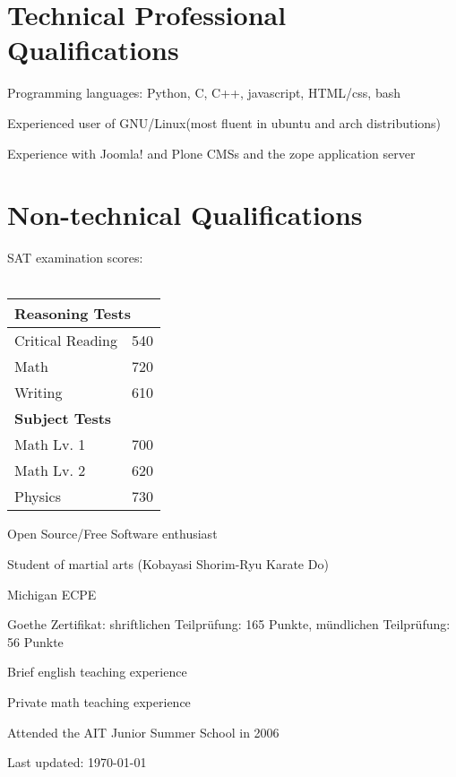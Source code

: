 \documentclass[letterpaper]{article}
\renewenvironment{itemize}{
  \begin{list}{}{
      \setlength{\leftmargin}{1.5em}
    }
  }{
  \end{list}
}
\begin{document}
\section*{Technical Professional Qualifications}

\begin{itemize}
\item Programming languages: Python, C, C++, javascript, HTML/css, bash
\item Experienced user of GNU/Linux(most fluent in ubuntu and arch
  distributions)
\item Experience with Joomla! and Plone CMSs and the zope application server
\end{itemize}

\section*{Non-technical Qualifications}

\begin{itemize}
\item SAT examination scores: \\ \\
  \indent
  \begin{tabular}{|l|c|}
    \hline
    \multicolumn{2}{|l|}{\bf Reasoning Tests} \\
    \hline
    Critical Reading & 540 \\
    \hline
    Math & 720 \\
    \hline
    Writing & 610 \\
    \hline
    \multicolumn{2}{|l|}{\bf Subject Tests}\\
    \hline
    Math Lv. 1 & 700 \\
    \hline
    Math Lv. 2 & 620 \\
    \hline
    Physics & 730 \\
    \hline
  \end{tabular}
\item Open Source/Free Software enthusiast
\item Student of martial arts (Kobayasi Shorim-Ryu Karate Do)
\item Michigan ECPE
\item Goethe Zertifikat: shriftlichen Teilpr\"{u}fung: 165 Punkte, m\"{u}ndlichen Teilpr\"{u}fung: 56 Punkte
\item Brief english teaching experience
\item Private math teaching experience
\item Attended the AIT Junior Summer School in 2006
\end{itemize}

\vfill

\begin{center}
  \begin{footnotesize}
    Last updated: \today
  \end{footnotesize}
\end{center}
\end{document}

